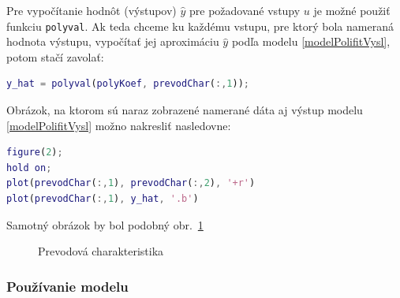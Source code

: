 \documentclass[a4paper, 10pt, ]{article}
\begin{document}
Pre vypočítanie hodnôt (výstupov) $\hat y$ pre požadované vstupy $u$ je možné použiť funkciu \verb|polyval|. Ak teda chceme ku každému vstupu, pre ktorý bola nameraná hodnota výstupu, vypočítať jej aproximáciu $\hat y$ podľa modelu \eqref{modelPolifitVysl}, potom stačí zavolať:
\begin{lstlisting}[language=Matlab,]
y_hat = polyval(polyKoef, prevodChar(:,1));
\end{lstlisting}
Obrázok, na ktorom sú naraz zobrazené namerané dáta aj výstup modelu \eqref{modelPolifitVysl} možno nakresliť nasledovne:
\begin{lstlisting}[language=Matlab,]
figure(2);
hold on;
plot(prevodChar(:,1), prevodChar(:,2), '+r')
plot(prevodChar(:,1), y_hat, '.b')
\end{lstlisting}
Samotný obrázok by bol podobný obr.~\ref{Prevodová charakteristika namer vs model}





\begin{figure}[!ht]
	\centering


    \vspace{-4mm}

	\caption{Prevodová charakteristika}
	\label{Prevodová charakteristika namer vs model}

\end{figure}





\subsubsection{Používanie modelu}
\end{document}
